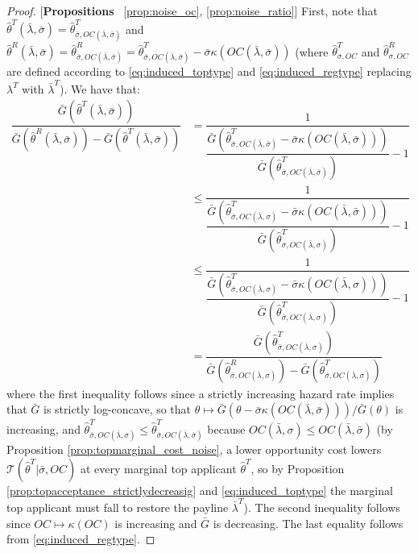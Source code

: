\begin{proof}{[\textbf{Propositions} ~\ref{prop:noise_oc}, \ref{prop:noise_ratio}]}
\noindent First, note that $\hat{\theta}^T(\bar{\lambda},\bar{\sigma}) = \hat\theta^T_{\bar{\sigma},OC(\bar{\lambda},\bar{\sigma})}$ and $\hat{\theta}^R(\bar{\lambda},\bar{\sigma}) = \hat{\theta}^R_{\bar{\sigma},OC(\bar{\lambda},\bar{\sigma})} = \hat{\theta}^T_{\bar{\sigma},OC(\bar{\lambda},\bar{\sigma})} - \bar{\sigma}\kappa(OC(\bar{\lambda},\bar{\sigma}))$ (where $\hat{\theta}^T_{\sigma,OC}$ and $\hat{\theta}^R_{\sigma,OC}$ are defined according to \eqref{eq:induced_toptype} and \eqref{eq:induced_regtype} replacing $\lambda^T$ with $\bar{\lambda}^T$). We have that:
\begin{align*}
    \dfrac{\bar{G}(\hat{\theta}^T(\bar{\lambda},\bar{\sigma}) )}{\bar{G}(\hat{\theta}^R(\bar{\lambda},\bar{\sigma}) ) - \bar{G}(\hat{\theta}^T(\bar{\lambda},\bar{\sigma}) )} &= \dfrac{1}{\dfrac{\bar{G}(\hat{\theta}^T_{\bar{\sigma},OC(\bar{\lambda},\bar{\sigma})}-\bar{\sigma}\kappa(OC(\bar{\lambda},\bar{\sigma})))}{\bar{G}(\hat{\theta}^T_{\bar{\sigma},OC(\bar{\lambda},\bar{\sigma})})} - 1} \\
    &\leq \dfrac{1}{\dfrac{\bar{G}(\hat{\theta}^T_{\bar{\sigma},OC(\bar{\lambda},\sigma)}-\bar{\sigma}\kappa(OC(\bar{\lambda},\bar{\sigma})))}{\bar{G}(\hat{\theta}^T_{\bar{\sigma},OC(\bar{\lambda},\sigma)})} - 1} \\
    &\leq \dfrac{1}{\dfrac{\bar{G}(\hat{\theta}^T_{\bar{\sigma},OC(\bar{\lambda},\sigma)}-\bar{\sigma}\kappa(OC(\bar{\lambda},\sigma)))}{\bar{G}(\hat{\theta}^T_{\bar{\sigma},OC(\bar{\lambda},\sigma)})} - 1} \\
    &= \dfrac{\bar{G}(\hat{\theta}^T_{\bar{\sigma},OC(\bar{\lambda},\sigma)})}{\bar{G}(\hat{\theta}^R_{\bar{\sigma},OC(\bar{\lambda},\sigma)}) - \bar{G}(\hat{\theta}^T_{\bar{\sigma},OC(\bar{\lambda},\sigma)})}
\end{align*}
where the first inequality follows since a strictly increasing hazard rate implies that $\bar{G}$ is strictly log-concave, so that $\theta\mapsto \bar{G}(\theta-\bar{\sigma}\kappa(OC(\bar{\lambda},\bar{\sigma})))/\bar{G}(\theta)$ is increasing, and $\hat{\theta}^T_{\bar{\sigma},OC(\bar{\lambda},\sigma)}\leq \hat{\theta}^T_{\bar{\sigma},OC(\bar{\lambda},\bar{\sigma})}$ because $OC(\bar{\lambda},\sigma)\leq OC(\bar{\lambda},\bar{\sigma})$ (by Proposition \ref{prop:topmarginal_cost_noise}, a lower opportunity cost lowers $\mathcal{T}(\hat{\theta}^T|\bar{\sigma},OC)$ at every marginal top applicant $\hat{\theta}^T$, so by Proposition \ref{prop:topacceptance_strictlydecreasig} and \eqref{eq:induced_toptype} the marginal top applicant must fall to restore the payline $\bar{\lambda}^T$). The second inequality follows since $OC\mapsto\kappa(OC)$ is increasing and $\bar{G}$ is decreasing. The last equality follows from \eqref{eq:induced_regtype}.


\end{proof}
